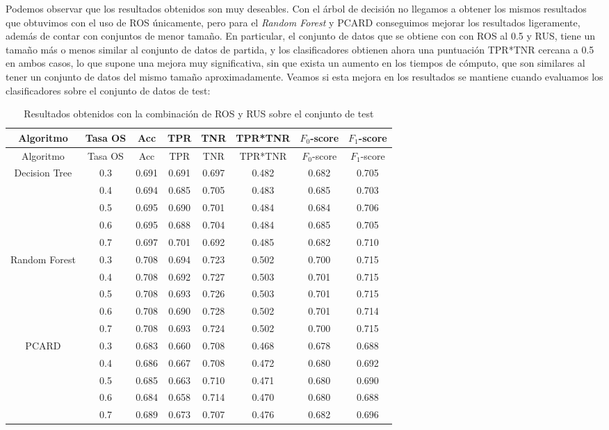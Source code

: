 \documentclass[
  a4paper,
,tablecaptionabove
]{scrartcl}
\begin{document}
Podemos observar que los resultados obtenidos son muy deseables. Con el
árbol de decisión no llegamos a obtener los mismos resultados que
obtuvimos con el uso de ROS únicamente, pero para el \emph{Random
Forest} y PCARD conseguimos mejorar los resultados ligeramente, además
de contar con conjuntos de menor tamaño. En particular, el conjunto de
datos que se obtiene con con ROS al 0.5 y RUS, tiene un tamaño más o
menos similar al conjunto de datos de partida, y los clasificadores
obtienen ahora una puntuación TPR*TNR cercana a 0.5 en ambos casos, lo
que supone una mejora muy significativa, sin que exista un aumento en
los tiempos de cómputo, que son similares al tener un conjunto de datos
del mismo tamaño aproximadamente. Veamos si esta mejora en los
resultados se mantiene cuando evaluamos los clasificadores sobre el
conjunto de datos de test:

\begin{longtable}[]{@{}cccccccc@{}}
\caption{Resultados obtenidos con la combinación de ROS y RUS sobre el
conjunto de test}\tabularnewline
\toprule
Algoritmo & Tasa OS & Acc & TPR & TNR & TPR*TNR & \(F_0\)-score &
\(F_1\)-score\tabularnewline
\midrule
\endfirsthead
\toprule
Algoritmo & Tasa OS & Acc & TPR & TNR & TPR*TNR & \(F_0\)-score &
\(F_1\)-score\tabularnewline
\midrule
\endhead
Decision Tree & 0.3 & 0.691 & 0.691 & 0.697 & 0.482 & 0.682 &
0.705\tabularnewline
& 0.4 & 0.694 & 0.685 & 0.705 & 0.483 & 0.685 & 0.703\tabularnewline
& 0.5 & 0.695 & 0.690 & 0.701 & 0.484 & 0.684 & 0.706\tabularnewline
& 0.6 & 0.695 & 0.688 & 0.704 & 0.484 & 0.685 & 0.705\tabularnewline
& 0.7 & 0.697 & 0.701 & 0.692 & 0.485 & 0.682 & 0.710\tabularnewline
\midrule
Random Forest & 0.3 & 0.708 & 0.694 & 0.723 & 0.502 & 0.700 &
0.715\tabularnewline
& 0.4 & 0.708 & 0.692 & 0.727 & 0.503 & 0.701 & 0.715\tabularnewline
& 0.5 & 0.708 & 0.693 & 0.726 & 0.503 & 0.701 & 0.715\tabularnewline
& 0.6 & 0.708 & 0.690 & 0.728 & 0.502 & 0.701 & 0.714\tabularnewline
& 0.7 & 0.708 & 0.693 & 0.724 & 0.502 & 0.700 & 0.715\tabularnewline
\midrule
PCARD & 0.3 & 0.683 & 0.660 & 0.708 & 0.468 & 0.678 &
0.688\tabularnewline
& 0.4 & 0.686 & 0.667 & 0.708 & 0.472 & 0.680 & 0.692\tabularnewline
& 0.5 & 0.685 & 0.663 & 0.710 & 0.471 & 0.680 & 0.690\tabularnewline
& 0.6 & 0.684 & 0.658 & 0.714 & 0.470 & 0.680 & 0.688\tabularnewline
& 0.7 & 0.689 & 0.673 & 0.707 & 0.476 & 0.682 & 0.696\tabularnewline
\bottomrule
\end{longtable}
\end{document}
